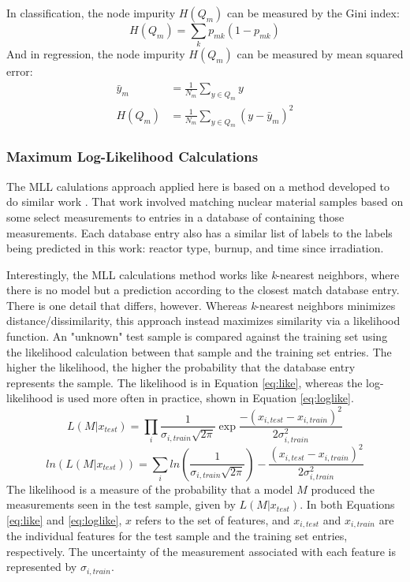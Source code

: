 In classification, the node impurity $H(Q_m)$ can be measured by the Gini index: 
\begin{equation}
  H(Q_m) = \sum_k p_{mk} (1 - p_{mk})
\end{equation}
And in regression, the node impurity $H(Q_m)$ can be measured by mean squared error:
\begin{equation}
  \begin{aligned}
    \bar{y}_m &= \frac{1}{N_m} \sum_{y \in Q_m} y \\
    H(Q_m) &= \frac{1}{N_m} \sum_{y \in Q_m} (y - \bar{y}_m)^2
  \end{aligned}
\end{equation}

\subsubsection{Maximum Log-Likelihood Calculations}

The \gls{MLL} calulations approach applied here is based on a method developed
to do similar work \cite{mll_method, mll_validate, mll_sensitivity}.  That work
involved matching nuclear material samples based on some select measurements to
entries in a database of containing those measurements.
Each database entry also has a similar list of labels to the labels being
predicted in this work: reactor type, burnup, and time since irradiation.

Interestingly, the \gls{MLL} calculations method works like \textit{k}-nearest
neighbors, where there is no model but a prediction according to the closest
match database entry.  There is one detail that differs, however. Whereas
\textit{k}-nearest neighbors minimizes distance/dissimilarity, this approach
instead maximizes similarity via a likelihood function. An "unknown" test
sample is compared against the training set using the likelihood calculation
between that sample and the training set entries.  The higher the likelihood,
the higher the probability that the database entry represents the sample. The
likelihood is in Equation \ref{eq:like}, whereas the log-likelihood is used
more often in practice, shown in Equation \ref{eq:loglike}.
\begin{equation}
  L(M|x_{test}) = \prod_i \frac{1}{\sigma_{i,train} \sqrt{2\pi}} \exp{\frac{-(x_{i,test} - x_{i,train})^2}{2 \sigma_{i,train}^2}}
  \label{eq:like}
\end{equation}
\begin{equation}
  ln(L(M|x_{test})) = \sum_i ln(\frac{1}{\sigma_{i,train} \sqrt{2\pi}}) - \frac{(x_{i,test} - x_{i,train})^2}{2 \sigma_{i,train}^2}
  \label{eq:loglike}
\end{equation}
The likelihood is a measure of the probability that a model $M$ produced the
measurements seen in the test sample, given by $L(M|x_{test})$.  In both
Equations \ref{eq:like} and \ref{eq:loglike}, $x$ refers to the set of
features, and $x_{i, test}$ and $x_{i,train}$ are the individual features for the
test sample and the training set entries, respectively. The uncertainty of the
measurement associated with each feature is represented by $\sigma_{i,train}$.

